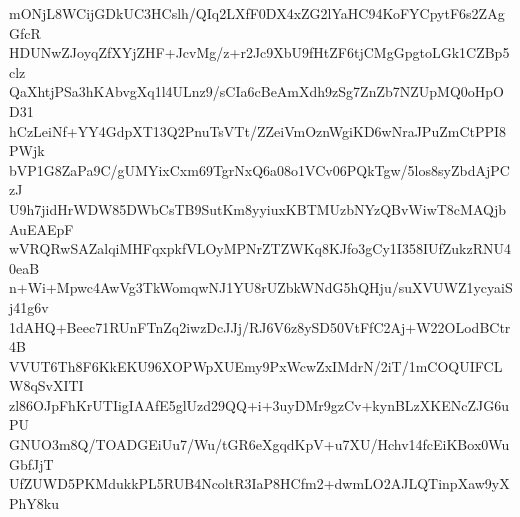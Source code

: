 mONjL8WCijGDkUC3HCslh/QIq2LXfF0DX4xZG2lYaHC94KoFYCpytF6s2ZAgGfcR
HDUNwZJoyqZfXYjZHF+JcvMg/z+r2Jc9XbU9fHtZF6tjCMgGpgtoLGk1CZBp5clz
QaXhtjPSa3hKAbvgXq1l4ULnz9/sCIa6cBeAmXdh9zSg7ZnZb7NZUpMQ0oHpOD31
hCzLeiNf+YY4GdpXT13Q2PnuTsVTt/ZZeiVmOznWgiKD6wNraJPuZmCtPPI8PWjk
bVP1G8ZaPa9C/gUMYixCxm69TgrNxQ6a08o1VCv06PQkTgw/5los8syZbdAjPCzJ
U9h7jidHrWDW85DWbCsTB9SutKm8yyiuxKBTMUzbNYzQBvWiwT8cMAQjbAuEAEpF
wVRQRwSAZalqiMHFqxpkfVLOyMPNrZTZWKq8KJfo3gCy1I358IUfZukzRNU40eaB
n+Wi+Mpwc4AwVg3TkWomqwNJ1YU8rUZbkWNdG5hQHju/suXVUWZ1ycyaiSj41g6v
1dAHQ+Beec71RUnFTnZq2iwzDcJJj/RJ6V6z8ySD50VtFfC2Aj+W22OLodBCtr4B
VVUT6Th8F6KkEKU96XOPWpXUEmy9PxWcwZxIMdrN/2iT/1mCOQUIFCLW8qSvXITI
zl86OJpFhKrUTIigIAAfE5glUzd29QQ+i+3uyDMr9gzCv+kynBLzXKENcZJG6uPU
GNUO3m8Q/TOADGEiUu7/Wu/tGR6eXgqdKpV+u7XU/Hchv14fcEiKBox0WuGbfJjT
UfZUWD5PKMdukkPL5RUB4NcoltR3IaP8HCfm2+dwmLO2AJLQTinpXaw9yXPhY8ku
